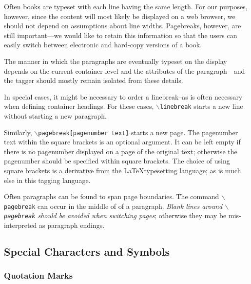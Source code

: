 \documentclass[11pt]{article}
\newcommand{\cmd}[1]{{\tt $\backslash$#1}}
\begin{document}


Often books are typeset with each line having the same length. For our
purposes, however, since the content will most likely be displayed on
a web browser, we should not depend on assumptions about line
widths. Pagebreaks, however, are still important---we would like to
retain this information so that the users can easily switch between
electronic and hard-copy versions of a book.

The manner in which the paragraphs are eventually typeset on the
display depends on the current container level and the attributes of
the paragraph---and the tagger should mostly remain isolated from these
details.

In special cases, it might be necessary to order a linebreak--as is
often necessary when defining container headings. For these cases,
\cmd{linebreak} starts a new line without starting a new
paragraph.

Similarly, \cmd{pagebreak[pagenumber text]} starts a new page. The
pagenumber text within the square brackets is an optional argument. It
can be left empty if there is no pagenumber displayed on a page of the
original text; otherwise the pagenumber should be specified within
square brackets. The choice of using square brackets is a derivative
from the \LaTeX typesetting language; as is much else in this tagging
language.

Often paragraphs can be found to span page boundaries. The command
\cmd{pagebreak} can occur in the middle of of a paragraph. \emph{Blank
  lines around \cmd{pagebreak} should be avoided when switching
  pages}; otherwise they may be mis-interpreted as paragraph endings.

\subsection{Special Characters and Symbols}

\subsubsection{Quotation Marks}
\end{document}
